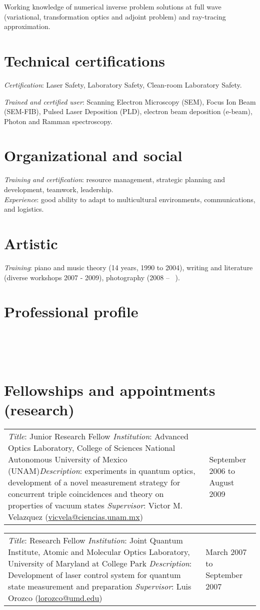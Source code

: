 \documentclass[margin,10pt]{res}
\newcommand{\subs}[1]{\normalfont #1}
\newcommand{\secs}[1]{\normalsize{\section{\subs{#1}}}}
\newcommand{\UNAM}{National Autonomous University of Mexico (UNAM)}
\begin{document}
Working knowledge of numerical inverse problem solutions at full wave (variational, transformation optics and adjoint problem) and ray-tracing approximation.

\secs{Technical certifications}
\emph{Certification}: Laser Safety, Laboratory Safety, Clean-room Laboratory Safety.

\emph{Trained and certified user}: Scanning Electron Microscopy (SEM), Focus Ion Beam (SEM-FIB), Pulsed Laser Deposition (PLD), electron beam deposition (e-beam), Photon and Ramman spectroscopy.

\secs{Organizational and social}
\emph{Training and certification}: resource management, strategic planning and development, teamwork, leadership.\\

\emph{Experience}: good ability to adapt to multicultural environments, communications, and logistics.

\secs{Artistic}
\emph{Training}: piano and music theory (14 years, 1990 to 2004), writing and literature (diverse workshops 2007 - 2009),  photography (2008 -- ~).


\section{Professional profile}

\secs{~~}
\secs{Fellowships and appointments (research)}
\begin{tabular}{p{3.8in} l}
\emph{Title}: Junior Research Fellow \newline \emph{Institution}: Advanced Optics Laboratory, College of Sciences \UNAM \newline \emph{Description}: experiments in quantum optics, development of a novel measurement strategy for concurrent triple coincidences and theory on properties of vacuum states \newline \emph{Supervisor}: Victor M. Velazquez (\href{mailto:vicvela@ciencias.unam.mx}{vicvela@ciencias.unam.mx}) \newline ~ & September 2006 to August 2009 
\end{tabular}

\begin{tabular}{p{3.8in} l}
 \emph{Title}: Research Fellow \newline \emph{Institution}: Joint Quantum Institute, Atomic and Molecular Optics Laboratory, University of Maryland at College Park \newline \emph{Description}: Development of laser control system for quantum state measurement and preparation \newline \emph{Supervisor}: Luis Orozco (\href{mailto:lorozco@umd.edu}{lorozco@umd.edu}) \newline & March 2007 to September 2007 \end{tabular}
\end{document}

